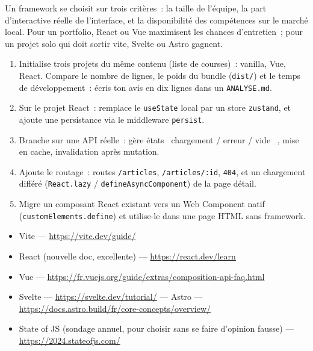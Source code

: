\begin{note}
Un framework se choisit sur trois crit\`eres~: la taille de l'\'equipe, la part d'interactive r\'eelle
de l'interface, et la disponibilit\'e des comp\'etences sur le march\'e local. Pour un portfolio,
React ou Vue maximisent les chances d'entretien~; pour un projet solo qui doit sortir vite,
Svelte ou Astro gagnent.
\end{note}

\begin{exercice}
\begin{enumerate}
  \item Initialise trois projets du m\^eme contenu (liste de courses)~: vanilla, Vue, React.
        Compare le nombre de lignes, le poids du bundle (\verb|dist/|) et le temps de
        d\'eveloppement~: \'ecris ton avis en dix lignes dans un \verb|ANALYSE.md|.
  \item Sur le projet React~: remplace le \verb|useState| local par un store \verb|zustand|,
        et ajoute une persistance via le middleware \verb|persist|.
  \item Branche  sur une API r\'eelle~: g\`ere
        \'etats \og ~chargement / erreur / vide~ \fg{}, mise en cache, invalidation apr\`es mutation.
  \item Ajoute le routage~: routes \verb|/articles|, \verb|/articles/:id|, \verb|404|,
        et un chargement diff\'er\'e (\verb|React.lazy| / \verb|defineAsyncComponent|) de la page d\'etail.
  \item Migre un composant React existant vers un Web Component natif (\verb|customElements.define|)
        et utilise-le dans une page HTML sans framework.
\end{enumerate}
\end{exercice}

\begin{ressources}
\begin{itemize}
  \item Vite --- \url{https://vite.dev/guide/}
  \item React (nouvelle doc, excellente) --- \url{https://react.dev/learn}
  \item Vue --- \url{https://fr.vuejs.org/guide/extras/composition-api-faq.html}
  \item Svelte --- \url{https://svelte.dev/tutorial/} --- Astro --- \url{https://docs.astro.build/fr/core-concepts/overview/}
  \item State of JS (sondage annuel, pour choisir sans se faire d'opinion fausse) --- \url{https://2024.stateofjs.com/}
\end{itemize}
\end{ressources}

